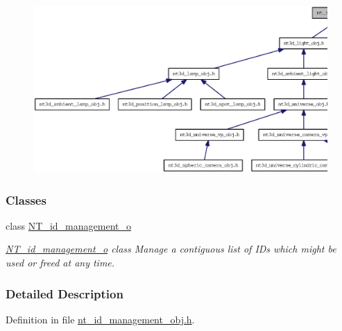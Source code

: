 \begin{figure}[H]
\begin{center}
\leavevmode
\includegraphics[width=400pt]{nt__id__management__obj_8h__dep__incl}
\end{center}
\end{figure}
\subsubsection*{Classes}
\begin{DoxyCompactItemize}
\item 
class \hyperlink{class_n_t__id__management__o}{NT\_\-id\_\-management\_\-o}
\begin{DoxyCompactList}\small\item\em \hyperlink{class_n_t__id__management__o}{NT\_\-id\_\-management\_\-o} class Manage a contiguous list of IDs which might be used or freed at any time. \item\end{DoxyCompactList}\end{DoxyCompactItemize}


\subsubsection{Detailed Description}


Definition in file \hyperlink{nt__id__management__obj_8h_source}{nt\_\-id\_\-management\_\-obj.h}.

